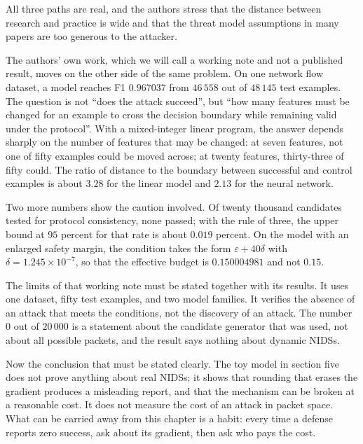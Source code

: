 All three paths are real, and the authors stress that the distance between research and
practice is wide and that the threat model assumptions in many papers are too generous
to the attacker.

The authors' own work, which we will call a working note and not a published
result, moves on the other side of the same problem. On one network flow dataset,
a model reaches F1 $0.967037$ from $46\,558$ out of $48\,145$ test examples.
The question is not ``does the attack succeed'', but ``how many features must be
changed for an example to cross the decision boundary while remaining valid under
the protocol''. With a mixed-integer linear program, the answer depends sharply
on the number of features that may be changed: at seven features, not one of fifty
examples could be moved across; at twenty features, thirty-three of fifty could.
The ratio of distance to the boundary between successful and control examples is about $3.28$
for the linear model and $2.13$ for the neural network.

Two more numbers show the caution involved. Of twenty thousand candidates tested for
protocol consistency, none passed; with the rule of three, the upper bound at $95$ percent
for that rate is about $0.019$ percent. On the model with an enlarged safety margin,
the condition takes the form $\varepsilon+40\delta$ with
$\delta=1.245\times10^{-7}$, so that the effective budget is $0.150004981$ and not
$0.15$.

The limits of that working note must be stated together with its results. It uses one dataset,
fifty test examples, and two model families. It verifies the absence of an attack that
meets the conditions, not the discovery of an attack. The number $0$ out of $20\,000$ is a statement
about the candidate generator that was used, not about all possible packets, and
the result says nothing about dynamic NIDSs.

Now the conclusion that must be stated clearly. The toy model in section five does not
prove anything about real NIDSs; it shows that rounding that erases the
gradient produces a misleading report, and that the mechanism can be broken
at a reasonable cost. It does not measure the cost of an attack in packet space. What can be carried
away from this chapter is a habit: every time a defense reports zero success,
ask about its gradient, then ask who pays the cost.

